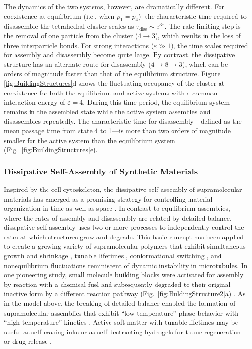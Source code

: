\begin{appendices}
The dynamics of the two systems, however, are dramatically different.  For coexistence at equilibrium (i.e., when $p_1=p_4$), the characteristic time required to disassemble the tetrahedral cluster scales as $\tau_{\text{diss}}\sim e^{3\varepsilon}$.  The rate limiting step is the removal of one particle from the cluster ($4\rightarrow 3$), which results in the loss of three interparticle bonds.  For strong interactions ($\varepsilon\gg1$), the time scales required for assembly and disassembly become quite large.  By contrast, the dissipative structure has an alternate route for disassembly ($4\rightarrow 8\rightarrow 3$), which can be orders of magnitude faster than that of the equilibrium structure.  Figure \ref{fig:BuildingStructures}d shows the fluctuating occupancy of the cluster at coexistence for both the equilibrium and active systems with a common interaction energy of $\varepsilon=4$.  During this time period, the equilibrium system remains in the assembled state while the active system assembles and disassembles repeatedly.  The characteristic time for disassembly---defined as the mean passage time from state 4 to 1---is more than two orders of magnitude smaller for the active system than the equilibrium system (Fig.~\ref{fig:BuildingStructures}e). 

\subsubsection{Dissipative Self-Assembly of Synthetic Materials}

Inspired by the cell cytoskeleton, the dissipative self-assembly of supramolecular materials has emerged as a promising strategy for controlling material organization in time as well as space \cite{VanRossum2017, De2018}. In contrast to equilibrium assemblies, where the rates of assembly and disassembly are related by detailed balance, dissipative self-assembly uses two or more processes to independently control the rates at which structures grow and degrade.  This basic concept has been applied to create a growing variety of supramolecular polymers \cite{Sorrenti2017} that exhibit simultaneous growth and shrinkage \cite{boekhoven2015transient}, tunable lifetimes \cite{Tena-Solsona2017}, conformational switching \cite{dhiman2017transient}, and nonequilibrium fluctuations \cite{boekhoven2015transient} reminiscent of dynamic instability in microtubules. In one pioneering study, small molecule building blocks were activated for assembly by reaction with a chemical fuel and subsequently degraded to their original inactive form by a different reaction pathway (Fig.~\ref{fig:BuldingStructure2}a) \cite{boekhoven2015transient}. As in the model above, the breaking of detailed balance enabled the formation of supramolecular assemblies that exhibit ``low-temperature'' phase behavior with ``high-temperature'' kinetics \cite{marsland2018active}.  Active soft matter with tunable lifetimes may be useful as self-erasing inks or as self-destructing hydrogels for tissue regeneration or drug release \cite{Rieß2018}.


\end{appendices}
